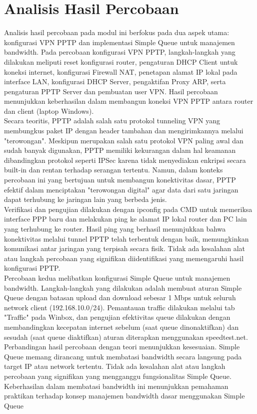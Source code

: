 \section{Analisis Hasil Percobaan}
Analisis hasil percobaan pada modul ini berfokus pada dua aspek utama: konfigurasi VPN PPTP dan implementasi Simple Queue untuk manajemen bandwidth. Pada percobaan konfigurasi VPN PPTP, langkah-langkah yang dilakukan meliputi reset konfigurasi router, pengaturan DHCP Client untuk koneksi internet, konfigurasi Firewall NAT, penetapan alamat IP lokal pada interface LAN, konfigurasi DHCP Server, pengaktifan Proxy ARP, serta pengaturan PPTP Server dan pembuatan user VPN. Hasil percobaan menunjukkan keberhasilan dalam membangun koneksi VPN PPTP antara router dan client (laptop Windows). \\ Secara teoritis, PPTP adalah salah satu protokol tunneling VPN yang membungkus paket IP dengan header tambahan dan mengirimkannya melalui "terowongan". Meskipun merupakan salah satu protokol VPN paling awal dan sudah banyak digunakan, PPTP memiliki kekurangan dalam hal keamanan dibandingkan protokol seperti IPSec karena tidak menyediakan enkripsi secara built-in dan rentan terhadap serangan tertentu. Namun, dalam konteks percobaan ini yang bertujuan untuk membangun konektivitas dasar, PPTP efektif dalam menciptakan "terowongan digital" agar data dari satu jaringan dapat terhubung ke jaringan lain yang berbeda jenis. \\ Verifikasi dan pengujian dilakukan dengan ipconfig pada CMD untuk memeriksa interface PPP baru dan melakukan ping ke alamat IP lokal router dan PC lain yang terhubung ke router. Hasil ping yang berhasil menunjukkan bahwa konektivitas melalui tunnel PPTP telah terbentuk dengan baik, memungkinkan komunikasi antar jaringan yang terpisah secara fisik. Tidak ada kesalahan alat atau langkah percobaan yang signifikan diidentifikasi yang memengaruhi hasil konfigurasi PPTP. \\ Percobaan kedua melibatkan konfigurasi Simple Queue untuk manajemen bandwidth. Langkah-langkah yang dilakukan adalah membuat aturan Simple Queue dengan batasan upload dan download sebesar 1 Mbps untuk seluruh network client (192.168.10.0/24). Pemantauan traffic dilakukan melalui tab "Traffic" pada Winbox, dan pengujian efektivitas queue dilakukan dengan membandingkan kecepatan internet sebelum (saat queue dinonaktifkan) dan sesudah (saat queue diaktifkan) aturan diterapkan menggunakan speedtest.net. \\ Perbandingan hasil percobaan dengan teori menunjukkan kesesuaian. Simple Queue memang dirancang untuk membatasi bandwidth secara langsung pada target IP atau network tertentu. Tidak ada kesalahan alat atau langkah percobaan yang signifikan yang mengganggu fungsionalitas Simple Queue. Keberhasilan dalam membatasi bandwidth ini menunjukkan pemahaman praktikan terhadap konsep manajemen bandwidth dasar menggunakan Simple Queue

